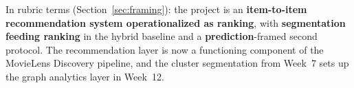 \documentclass[12pt,a4paper]{article}
\begin{document}
In rubric terms (Section~\ref{sec:framing}): the project is an \textbf{item-to-item
recommendation system operationalized as ranking}, with \textbf{segmentation feeding ranking}
in the hybrid baseline and a \textbf{prediction}-framed second protocol. The recommendation
layer is now a functioning component of the MovieLens Discovery pipeline, and the cluster
segmentation from Week~7 sets up the graph analytics layer in Week~12.
\end{document}

